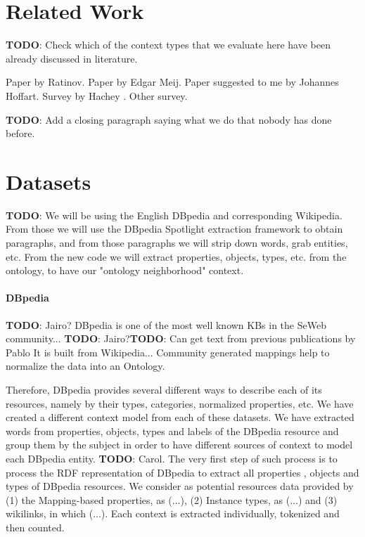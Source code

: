 \documentclass[10pt,a4paper]{article}
\newcommand{\todo}[1]{{\color{red}\textsf{\textbf{TODO}}: #1}}
\begin{document}


\section{Related Work}

\todo{Check which of the context types that we evaluate here have been already discussed in literature.}

Paper by Ratinov. \cite{acl11ratinov}
Paper by Edgar Meij. \cite{wsdm12meij}
Paper suggested to me by Johannes Hoffart.
Survey by Hachey \cite{aij13hachey}.
Other survey.

\todo{Add a closing paragraph saying what we do that nobody has done before.}

\section{Datasets}
\todo{We will be using the English DBpedia and corresponding Wikipedia. From those we will use the DBpedia Spotlight extraction framework to obtain paragraphs, and from those paragraphs we will strip down words, grab entities, etc. From the new code we will extract properties, objects, types, etc. from the ontology, to have our "ontology neighborhood" context.}

\paragraph{DBpedia}\todo{Jairo?}
DBpedia \cite{swj13dbpedia} is one of the most well known KBs in the SeWeb community... \todo{Jairo?}\todo{Can get text from previous publications by Pablo}
It is built from Wikipedia...
Community generated mappings help to normalize the data into an Ontology.

Therefore, DBpedia provides several different ways to describe each of its resources, namely by their types, categories, normalized properties, etc.
We have created a different context model from each of these datasets.
We have extracted words from properties, objects, types and labels of the DBpedia resource and group them by the subject in order to have  different sources of context to model each DBpedia entity. \todo{Carol}.
The very first step of such process is to process the RDF representation of DBpedia to extract all properties , objects and types of DBpedia resources. We consider as potential resources data provided by (1) the Mapping-based properties, as (...), (2) Instance types, as (...) and (3) wikilinks, in which (...). Each context is extracted individually, tokenized and then counted. 
\end{document}
